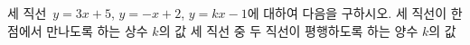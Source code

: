 세 직선~$y=3x+5$, $y=-x+2$, $y=kx-1$에 대하여 다음을 구하시오.
 세 직선이 한 점에서 만나도록 하는 상수 $k$의 값
 세 직선 중 두 직선이 평행하도록 하는 양수 $k$의 값
